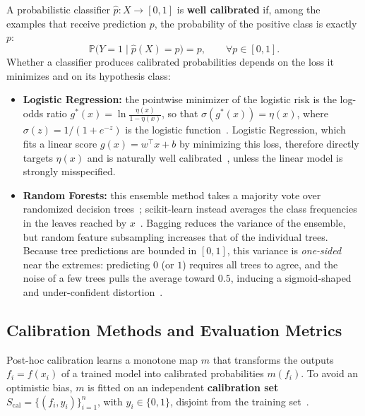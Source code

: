 \documentclass[a4paper, 10pt]{article}
\begin{document}
A probabilistic classifier $\hat{p} : X \to [0, 1]$ is \textbf{well calibrated} if, among the examples that receive prediction $p$, the probability of the positive class is exactly $p$:
\begin{equation}\label{eq:calibration}
    \mathbb{P}\big(Y = 1 \;\big|\; \hat{p}(X) = p\big) = p, \qquad \forall p \in [0, 1].
\end{equation}
Whether a classifier produces calibrated probabilities depends on the loss it minimizes and on its hypothesis class:
\begin{itemize}
    \item \textbf{Logistic Regression:} the pointwise minimizer of the logistic risk is the log-odds ratio $g^*(x) = \ln\frac{\eta(x)}{1 - \eta(x)}$, so that $\sigma(g^*(x)) = \eta(x)$, where $\sigma(z) = 1/(1 + e^{-z})$ is the logistic function~\cite{cesabianchi2026notes}. Logistic Regression, which fits a linear score $g(x) = w^\top x + b$ by minimizing this loss, therefore directly targets $\eta(x)$ and is naturally well calibrated~\cite{niculescu2005predicting}, unless the linear model is strongly misspecified.
    \item \textbf{Random Forests:} this ensemble method takes a majority vote over randomized decision trees~\cite{cesabianchi2026notes}; scikit-learn instead averages the class frequencies in the leaves reached by $x$~\cite{pedregosa2011scikit}. Bagging reduces the variance of the ensemble, but random feature subsampling increases that of the individual trees. Because tree predictions are bounded in $[0, 1]$, this variance is \textit{one-sided} near the extremes: predicting $0$ (or $1$) requires all trees to agree, and the noise of a few trees pulls the average toward $0.5$, inducing a sigmoid-shaped and under-confident distortion~\cite{niculescu2005predicting}.
\end{itemize}

\subsection{Calibration Methods and Evaluation Metrics}\label{sec:methods}
Post-hoc calibration learns a monotone map $m$ that transforms the outputs $f_i = f(x_i)$ of a trained model into calibrated probabilities $m(f_i)$. To avoid an optimistic bias, $m$ is fitted on an independent \textbf{calibration set} $S_{\mathrm{cal}} = \{(f_i, y_i)\}_{i=1}^{n}$, with $y_i \in \{0, 1\}$, disjoint from the training set~\cite{niculescu2005predicting}.
 
\end{document}
